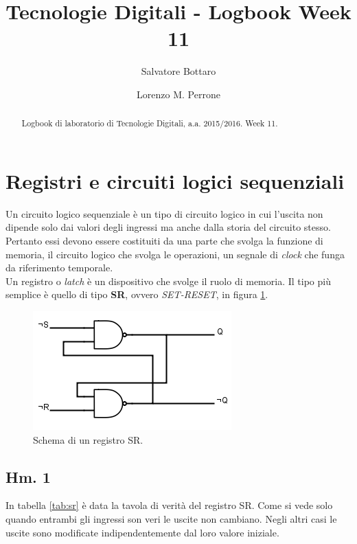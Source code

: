 \documentclass[journal, a4paper]{IEEEtran}
\begin{document}
	\title{Tecnologie Digitali - Logbook Week 11}
	\author[1]{Salvatore Bottaro}
		\author[2]{Lorenzo M. Perrone}
	\maketitle
	
\begin{abstract}
	Logbook di laboratorio di Tecnologie Digitali, a.a. 2015/2016. Week 11.
\end{abstract}

\section{Registri e circuiti logici sequenziali}

Un circuito logico sequenziale è un tipo di circuito logico in cui l'uscita non dipende solo dai valori degli ingressi ma anche dalla storia del circuito stesso. Pertanto essi devono essere costituiti da una parte che svolga la funzione di memoria, il circuito logico che svolga le operazioni, un segnale di \textit{clock} che funga da riferimento temporale.\\
Un registro o \textit{latch} è un dispositivo che svolge il ruolo di memoria. Il tipo più semplice è quello di tipo \textbf{SR}, ovvero \textit{SET-RESET}, in figura \ref{fig:sr}.

\begin{figure}[htp]
\centering
\includegraphics[scale=.5]{SR}
\caption{Schema di un registro SR.}
\label{fig:sr}
\end{figure}

\subsection{Hm. 1}

In tabella \ref{tab:sr} è data la tavola di verità del registro SR. Come si vede solo quando entrambi gli ingressi son veri le uscite non cambiano. Negli altri casi le uscite sono modificate indipendentemente dal loro valore iniziale.
\end{document}
